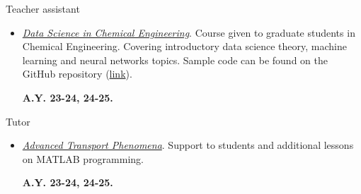 \begin{position_simple}{Teacher assistant}{\polimi}
\begin{itemize}

   \item[ ]
      \begin{minipage}[t]{0.75\textwidth}
        \ul{\it Data Science in Chemical Engineering}. Course given to
        graduate students in Chemical Engineering. Covering introductory data science theory, machine learning and neural networks topics. Sample code can be found on the GitHub repository
        (\href{https://github.com/Riccaraccio/Data-Science}{link}).
      \end{minipage}
      \begin{minipage}[t]{0.15\textwidth}
         \begin{flushright}
            \bfseries A.Y. 23-24, 24-25.
         \end{flushright}
      \end{minipage}

\end{itemize}
\end{position_simple}

\begin{position_simple}{Tutor}{\polimi}
\begin{itemize}
    \item[ ]
      \begin{minipage}[t]{0.75\textwidth}
         \ul{\it Advanced Transport Phenomena}. Support to students and additional lessons on MATLAB programming.
      \end{minipage}
      \begin{minipage}[t]{0.14\textwidth}
         \begin{flushright}
            \bfseries A.Y. 23-24, 24-25.
         \end{flushright}
      \end{minipage}
\end{itemize}
\end{position_simple}
